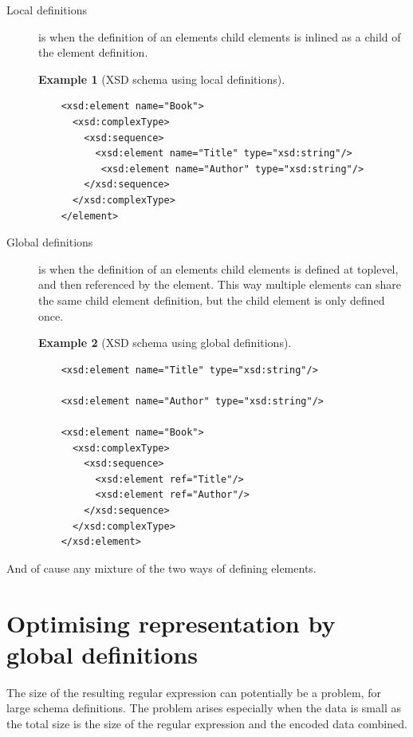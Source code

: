 \documentclass[a4paper, oneside]{memoir}
\theoremstyle{definition}
\newtheorem{example}{Example}
\begin{document}
\begin{description}
\item[Local definitions] is when the definition of an elements child elements is
  inlined as a child of the element definition. 

  \begin{example}[XSD schema using local definitions] \ %
\begin{verbatim}
    <xsd:element name="Book"> 
      <xsd:complexType> 
        <xsd:sequence> 
          <xsd:element name="Title" type="xsd:string"/> 
           <xsd:element name="Author" type="xsd:string"/> 
        </xsd:sequence> 
      </xsd:complexType> 
    </element>
\end{verbatim}
  \end{example}

\item[Global definitions] is when the definition of an elements child elements
  is defined at toplevel, and then referenced by the element. This way multiple
  elements can share the same child element definition, but the child element is
  only defined once.

  \begin{example}[XSD schema using global definitions] \ %
\begin{verbatim}
    <xsd:element name="Title" type="xsd:string"/>

    <xsd:element name="Author" type="xsd:string"/>

    <xsd:element name="Book">
      <xsd:complexType> 
        <xsd:sequence> 
          <xsd:element ref="Title"/> 
          <xsd:element ref="Author"/>
        </xsd:sequence> 
      </xsd:complexType> 
    </xsd:element>
\end{verbatim}
  \end{example}

\end{description}

And of cause any mixture of the two ways of defining elements.



\section{Optimising representation by global definitions}

The size of the resulting regular expression can potentially be a problem, for
large schema definitions. The problem arises especially when the data is small
as the total size is the size of the regular expression and the encoded data
combined.
\end{document}
